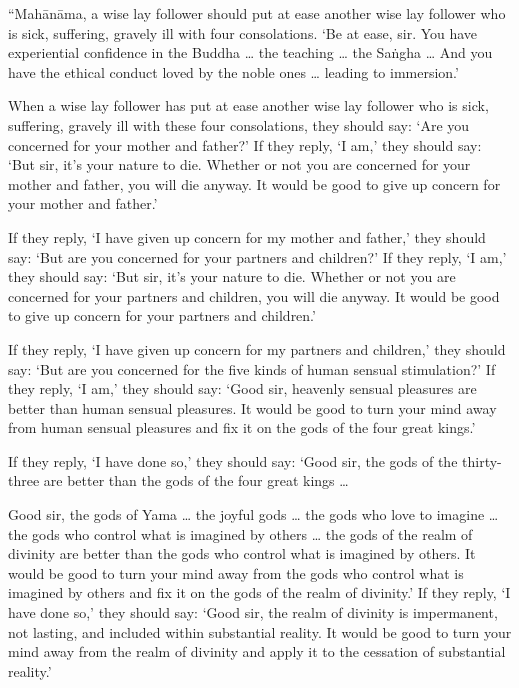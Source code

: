 \documentclass[12pt,openany]{book}%
\begin{document}
“\textsanskrit{Mahānāma}, a wise lay follower should put at ease another wise lay follower who is sick, suffering, gravely ill with four consolations. ‘Be at ease, sir. You have experiential confidence in the Buddha … the teaching … the \textsanskrit{Saṅgha} … And you have the ethical conduct loved by the noble ones … leading to immersion.’ 

When a wise lay follower has put at ease another wise lay follower who is sick, suffering, gravely ill with these four consolations, they should say: ‘Are you concerned for your mother and father?’ If they reply, ‘I am,’ they should say: ‘But sir, it’s your nature to die. Whether or not you are concerned for your mother and father, you will die anyway. It would be good to give up concern for your mother and father.’ 

If they reply, ‘I have given up concern for my mother and father,’ they should say: ‘But are you concerned for your partners and children?’ If they reply, ‘I am,’ they should say: ‘But sir, it’s your nature to die. Whether or not you are concerned for your partners and children, you will die anyway. It would be good to give up concern for your partners and children.’ 

If they reply, ‘I have given up concern for my partners and children,’ they should say: ‘But are you concerned for the five kinds of human sensual stimulation?’ If they reply, ‘I am,’ they should say: ‘Good sir, heavenly sensual pleasures are better than human sensual pleasures. It would be good to turn your mind away from human sensual pleasures and fix it on the gods of the four great kings.’ 

If they reply, ‘I have done so,’ they should say: ‘Good sir, the gods of the thirty-three are better than the gods of the four great kings … 

Good sir, the gods of Yama … the joyful gods … the gods who love to imagine … the gods who control what is imagined by others … the gods of the realm of divinity are better than the gods who control what is imagined by others. It would be good to turn your mind away from the gods who control what is imagined by others and fix it on the gods of the realm of divinity.’ If they reply, ‘I have done so,’ they should say: ‘Good sir, the realm of divinity is impermanent, not lasting, and included within substantial reality. It would be good to turn your mind away from the realm of divinity and apply it to the cessation of substantial reality.’ 
\end{document}
